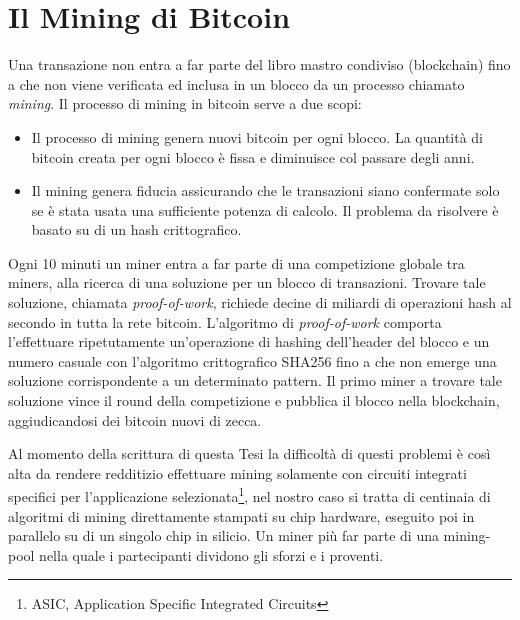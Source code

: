 \section{Il Mining di Bitcoin}
Una transazione non entra a far parte del libro mastro condiviso (blockchain) fino a che non viene verificata ed inclusa in un blocco da un processo chiamato \textit{mining}. Il processo di mining in bitcoin serve a due scopi:
\begin{itemize}
	\item Il processo di mining genera nuovi bitcoin per ogni blocco. La quantità di bitcoin creata per ogni blocco è fissa e diminuisce col passare degli anni.
	\item Il mining genera fiducia assicurando che le transazioni siano confermate solo se è stata usata una sufficiente potenza di calcolo. Il problema da risolvere è basato su di un hash crittografico.
\end{itemize}
Ogni 10 minuti un miner entra a far parte di una competizione globale tra miners, alla ricerca di una soluzione per un blocco di transazioni. Trovare tale soluzione, chiamata \textit{proof-of-work}, richiede decine di miliardi di operazioni hash al secondo in tutta la rete bitcoin. L'algoritmo di \textit{proof-of-work} comporta l'effettuare ripetutamente un'operazione di hashing dell'header del blocco e un numero casuale con l'algoritmo crittografico SHA256 fino a che non emerge una soluzione corrispondente a un determinato pattern. Il primo miner a trovare tale soluzione vince il round della competizione e pubblica il blocco nella blockchain, aggiudicandosi dei bitcoin nuovi di zecca.

Al momento della scrittura di questa Tesi la difficoltà di questi problemi è così alta da rendere redditizio effettuare mining solamente con circuiti integrati specifici per l'applicazione selezionata\footnote{ASIC, Application Specific Integrated Circuits}, nel nostro caso si tratta di centinaia di algoritmi di mining direttamente stampati su chip hardware, eseguito poi in parallelo su di un singolo chip in silicio. Un miner più far parte di una mining-pool nella quale i partecipanti dividono gli sforzi e i proventi.

